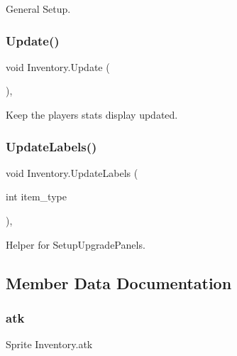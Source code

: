 General Setup. 

\mbox{\label{class_inventory_a7b1e7148da0c7b5e4d87b6ea07dce086}} 
\subsubsection{\texorpdfstring{Update()}{Update()}}
{\footnotesize\ttfamily void Inventory.\+Update (\begin{DoxyParamCaption}{ }\end{DoxyParamCaption})\hspace{0.3cm}{\ttfamily [inline]}, {\ttfamily [private]}}



Keep the player\textquotesingle{}s stats display updated. 

\mbox{\label{class_inventory_a5ff170daf3d949c611d8e064626524e2}} 
\subsubsection{\texorpdfstring{UpdateLabels()}{UpdateLabels()}}
{\footnotesize\ttfamily void Inventory.\+Update\+Labels (\begin{DoxyParamCaption}\item[{int}]{item\+\_\+type }\end{DoxyParamCaption})\hspace{0.3cm}{\ttfamily [inline]}, {\ttfamily [private]}}



Helper for Setup\+Upgrade\+Panels. 



\subsection{Member Data Documentation}
\mbox{\label{class_inventory_a8c34a2d39aab6ff22ec36e41763e2e22}} 
\subsubsection{\texorpdfstring{atk}{atk}}
{\footnotesize\ttfamily Sprite Inventory.\+atk}

